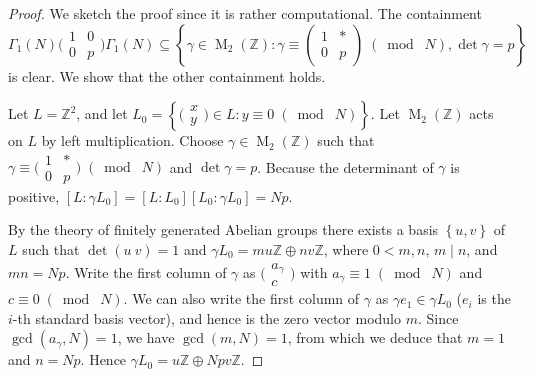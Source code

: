 \documentclass[10pt,leqno,twoside]{article}
\theoremstyle{plain}
\theoremstyle{definition}
\numberwithin{equation}{section}
\numberwithin{lem}{section}
\newcommand{\cbr}[1]{\left\{#1\right\}}
\DeclareMathOperator{\Mat}{M}
\newcommand{\smod}[1]{\;(\bmod\; #1)}
\begin{document}
\begin{proof}
    We sketch the proof since it is rather computational. The containment \[\varGamma_1(N)\big(\!\begin{smallmatrix}
        1 & 0 \\ 0 & p
    \end{smallmatrix}\!\big)\varGamma_1(N) \subseteq \cbr{\gamma\in \Mat_2(\mathbb Z) : \gamma \equiv \begin{pmatrix}
        1 & \ast \\ 0 & p
    \end{pmatrix}\smod N, \det\gamma = p}\] is clear. We show that the other containment holds.

    Let $L = \mathbb Z^2$, and let $L_0 = \cbr{\big(\!\begin{smallmatrix}
        x \\ y
    \end{smallmatrix}\!\big)\in L : y\equiv 0 \smod N}$. Let $\Mat_2(\mathbb Z)$ acts on $L$ by left multiplication. Choose $\gamma\in\Mat_2(\mathbb Z)$ such that $\gamma\equiv \big(\!\begin{smallmatrix}
        1 & \ast \\ 0 & p
    \end{smallmatrix}\!\big)\smod N$ and $\det \gamma = p$. Because the determinant of $\gamma$ is positive, $[L: \gamma L_0] = [L:L_0][L_0:\gamma L_0] = Np$.
    
    By the theory of finitely generated Abelian groups there exists a basis $\cbr{u,v}$ of $L$ such that $\det (u~v) = 1$ and $\gamma L_0 = mu\mathbb Z\oplus nv\mathbb Z$, where $0<m,n$, $m\mid n$, and $mn = Np$. Write the first column of $\gamma$ as $\big(\!\begin{smallmatrix}
        a_\gamma \\ c
    \end{smallmatrix}\!\big)$ with $a_\gamma\equiv 1\smod N$ and $c\equiv 0 \smod N$. We can also write the first column of $\gamma$ as $\gamma e_1 \in \gamma L_0$ ($e_i$ is the $i$-th standard basis vector), and hence is the zero vector modulo $m$. Since $\gcd(a_\gamma,N) = 1$, we have $\gcd(m,N) = 1$, from which we deduce that $m = 1$ and $n = Np$. Hence $\gamma L_0 = u\mathbb Z\oplus Npv\mathbb Z$.
    

\end{proof}
\end{document}
